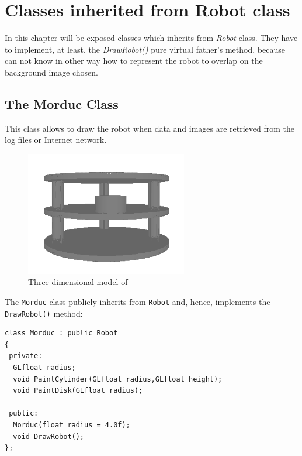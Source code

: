 \section{Classes inherited from Robot class}
\label{concr:robot_classes}

In this chapter will be exposed classes which inherits
from \textit{Robot} class. They have to implement, at least,
the \textit{DrawRobot()} pure virtual father's method,
because \framework{} can not know in other way how to
represent the robot to overlap on the background image chosen.

\subsection{The Morduc Class}
\label{concr:robot_classes:concr:morduc}

This class allows to draw the robot when data and images
are retrieved from the log files or Internet network.

\begin{figure}[!h]
  \begin{center}
    \includegraphics[width=200pt]{img/3morduc_opengl.png}
    \caption{Three dimensional model of \morduc}
    \label{fig:3morduc_opengl}
  \end{center}
\end{figure}

The \texttt{Morduc} class publicly inherits from \texttt{Robot} 
and, hence, implements the \texttt{DrawRobot()} method:

\begin{lstlisting}[caption={\texttt{Morduc} class declaration}, label={code:morducclass}, frame=trBL]
class Morduc : public Robot
{
 private:
  GLfloat radius;
  void PaintCylinder(GLfloat radius,GLfloat height);
  void PaintDisk(GLfloat radius);

 public:
  Morduc(float radius = 4.0f);
  void DrawRobot();
};
\end{lstlisting}

